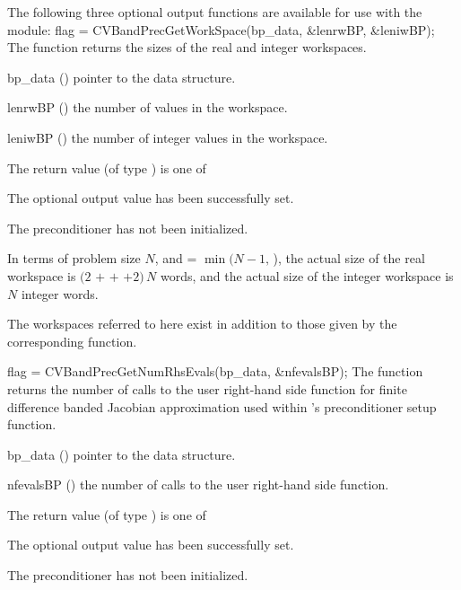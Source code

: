 The following three optional output functions are available for use with 
the {\cvbandpre} module:
{
  flag = CVBandPrecGetWorkSpace(bp\_data, \&lenrwBP, \&leniwBP);
}
{
  The function  returns the sizes of
  the {\cvbandpre} real and integer workspaces.
}
{
  \begin{args}[lenrwBP]
  \item[bp\_data] ()
    pointer to the {\cvbandpre} data structure.
  \item[lenrwBP] ()
    the number of  values in the {\cvbandpre} workspace.
  \item[leniwBP] ()
    the number of integer values in the {\cvbandpre} workspace.
  \end{args}
}
{
  The return value  (of type ) is one of
  \begin{args}
  \item[\Id{CVBANDPRE\_SUCCESS}] 
    The optional output value has been successfully set.
  \item[\Id{CVBANDPRE\_PDATA\_NULL}]
    The {\cvbandpre} preconditioner has not been initialized.
  \end{args}
}
{
  In terms of problem size $N$, and  = $\min(N-1,\,$),
  the actual size of the real workspace is
  $(2$  $+$  $+$  $+2)\, N$  words,
  and the actual size of the integer workspace is $N$ integer words.

  The workspaces referred to here exist in addition to those given by the
  corresponding  function.
}
{
  flag = CVBandPrecGetNumRhsEvals(bp\_data, \&nfevalsBP);
}
{
  The function  returns the
  number of calls to the user right-hand side function for
  finite difference banded Jacobian approximation used within
  {\cvbandpre}'s preconditioner setup function.
}
{
  \begin{args}[nfevalsBP]
  \item[bp\_data] ()
    pointer to the {\cvbandpre} data structure.
  \item[nfevalsBP] ()
    the number of calls to the user right-hand side function.
  \end{args}
}
{
  The return value  (of type ) is one of
  \begin{args}
  \item[\Id{CV\_SUCCESS}] 
    The optional output value has been successfully set.
  \item[\Id{CVBANDPRE\_PDATA\_NULL}]
    The {\cvbandpre} preconditioner has not been initialized.
  \end{args}
}
